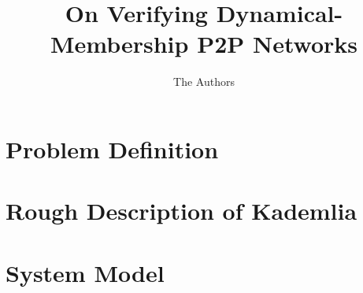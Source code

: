 \documentclass[acm,draft]{paper}
\begin{document}
\title{On Verifying Dynamical-Membership P2P Networks}

\author{The Authors}

\begin{abstract}

\end{abstract}

\maketitle
\pagestyle{plain}

\section{Problem Definition}
\label{sec:intro}


\section{Rough Description of Kademlia}


\section{System Model}



\end{document}
